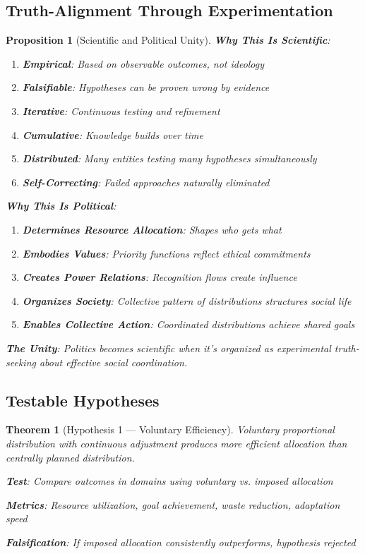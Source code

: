 \documentclass[11pt]{article}
\newtheorem{theorem}{Theorem}
\newtheorem{proposition}{Proposition}
\begin{document}
\subsection{Truth-Alignment Through Experimentation}

\begin{proposition}[Scientific and Political Unity]
\textbf{Why This Is Scientific}:
\begin{enumerate}
\item \textbf{Empirical}: Based on observable outcomes, not ideology
\item \textbf{Falsifiable}: Hypotheses can be proven wrong by evidence
\item \textbf{Iterative}: Continuous testing and refinement
\item \textbf{Cumulative}: Knowledge builds over time
\item \textbf{Distributed}: Many entities testing many hypotheses simultaneously
\item \textbf{Self-Correcting}: Failed approaches naturally eliminated
\end{enumerate}

\textbf{Why This Is Political}:
\begin{enumerate}
\item \textbf{Determines Resource Allocation}: Shapes who gets what
\item \textbf{Embodies Values}: Priority functions reflect ethical commitments
\item \textbf{Creates Power Relations}: Recognition flows create influence
\item \textbf{Organizes Society}: Collective pattern of distributions structures social life
\item \textbf{Enables Collective Action}: Coordinated distributions achieve shared goals
\end{enumerate}

\textbf{The Unity}: Politics becomes scientific when it's organized as experimental truth-seeking about effective social coordination.
\end{proposition}

\subsection{Testable Hypotheses}

\begin{theorem}[Hypothesis 1 — Voluntary Efficiency]
Voluntary proportional distribution with continuous adjustment produces more efficient allocation than centrally planned distribution.

\textbf{Test}: Compare outcomes in domains using voluntary vs. imposed allocation

\textbf{Metrics}: Resource utilization, goal achievement, waste reduction, adaptation speed

\textbf{Falsification}: If imposed allocation consistently outperforms, hypothesis rejected
\end{theorem}
\end{document}
